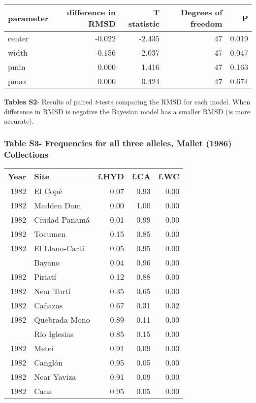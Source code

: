\documentclass[]{article}
\begin{document}
\begin{table}[H]
\centering
\begin{tabular}{lrrrr}
\toprule
parameter & difference in RMSD & T statistic & Degrees of freedom & P\\
\midrule
center & -0.022 & -2.435 & 47 & 0.019\\
width & -0.156 & -2.037 & 47 & 0.047\\
pmin & 0.000 & 1.416 & 47 & 0.163\\
pmax & 0.000 & 0.424 & 47 & 0.674\\
\bottomrule
\end{tabular}
\end{table}

\textbf{Tables S2}- Results of paired \textit{t}-tests comparing the
RMSD for each model. When difference in RMSD is negative the Bayesian
model has a smaller RMSD (is more accurate).

\pagebreak 

\subsubsection{Table S3- Frequencies for all three alleles, Mallet
(1986)
Collections}\label{table-s3--frequencies-for-all-three-alleles-mallet-1986-collections}

\begin{table}[H]
\centering
\begin{tabular}{rlrrr}
\toprule
Year & Site & f.HYD & f.CA & f.WC\\
\midrule
1982 & El Copé & 0.07 & 0.93 & 0.00\\
1982 & Madden Dam & 0.00 & 1.00 & 0.00\\
1982 & Ciudad Panamá & 0.01 & 0.99 & 0.00\\
1982 & Tocumen & 0.15 & 0.85 & 0.00\\
1982 & El Llano-Cartí & 0.05 & 0.95 & 0.00\\
\addlinespace
1982 & Bayano & 0.04 & 0.96 & 0.00\\
1982 & Piriatí & 0.12 & 0.88 & 0.00\\
1982 & Near Tortí & 0.35 & 0.65 & 0.00\\
1982 & Cañazas & 0.67 & 0.31 & 0.02\\
1982 & Quebrada Mono & 0.89 & 0.11 & 0.00\\
\addlinespace
1982 & Río Iglesias & 0.85 & 0.15 & 0.00\\
1982 & Meteí & 0.91 & 0.09 & 0.00\\
1982 & Canglón & 0.95 & 0.05 & 0.00\\
1982 & Near Yaviza & 0.91 & 0.09 & 0.00\\
1982 & Cana & 0.95 & 0.05 & 0.00\\
\bottomrule
\end{tabular}
\end{table}
\end{document}
